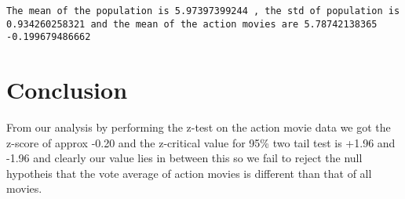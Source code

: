 \documentclass[11pt]{article}
\begin{document}
    \begin{Verbatim}[commandchars=\\\{\}]
The mean of the population is 5.97397399244 , the std of population is 0.934260258321 and the mean of the action movies are 5.78742138365
-0.199679486662

    \end{Verbatim}

    \section{Conclusion}\label{conclusion}

From our analysis by performing the z-test on the action movie data we
got the z-score of approx -0.20 and the z-critical value for 95\% two
tail test is +1.96 and -1.96 and clearly our value lies in between this
so we fail to reject the null hypotheis that the vote average of action
movies is different than that of all movies.


    
    
    
    
\end{document}
